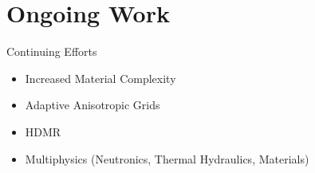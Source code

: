 \documentclass{beamer}
\begin{document}
\section{Ongoing Work}
\begin{frame}{Continuing Efforts}\vspace{-50pt}
\begin{itemize}
\item Increased Material Complexity
\item Adaptive  Anisotropic Grids
\item HDMR
\item Multiphysics (Neutronics, Thermal Hydraulics, Materials)
\end{itemize}
\end{frame}

\section{}
\begin{frame}{}

\end{frame}
\end{document}
